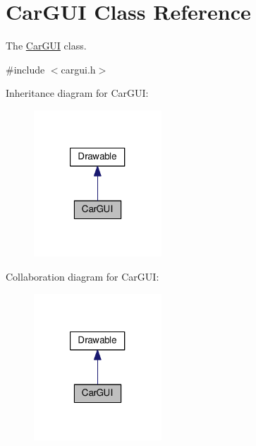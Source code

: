 \hypertarget{classCarGUI}{\section{Car\-G\-U\-I Class Reference}
\label{classCarGUI}
}


The \hyperlink{classCarGUI}{Car\-G\-U\-I} class.  




{\ttfamily \#include $<$cargui.\-h$>$}



Inheritance diagram for Car\-G\-U\-I\-:
\nopagebreak
\begin{figure}[H]
\begin{center}
\leavevmode
\includegraphics[width=136pt]{classCarGUI__inherit__graph}
\end{center}
\end{figure}


Collaboration diagram for Car\-G\-U\-I\-:
\nopagebreak
\begin{figure}[H]
\begin{center}
\leavevmode
\includegraphics[width=136pt]{classCarGUI__coll__graph}
\end{center}
\end{figure}

